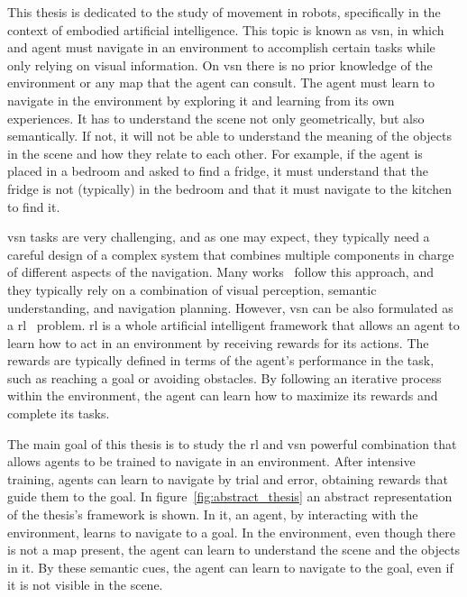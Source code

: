 This thesis is dedicated to the study of movement in robots, specifically in the context of embodied artificial intelligence.
This topic is known as \acrfull{vsn}, in which and agent must navigate in an environment to accomplish certain tasks while only relying on visual information.
On \acrshort{vsn} there is no prior knowledge of the environment or any map that the agent can consult.
The agent must learn to navigate in the environment by exploring it and learning from its own experiences.
It has to understand the scene not only geometrically, but also semantically.
If not, it will not be able to understand the meaning of the objects in the scene and how they relate to each other.
For example, if the agent is placed in a bedroom and asked to find a fridge, it must understand that the fridge is not (typically) in the bedroom and that it must navigate to the kitchen to find it.

\acrshort{vsn} tasks are very challenging, and as one may expect, they typically need a careful design of a complex system that combines multiple components in charge of different aspects of the navigation.
Many works~\cite{newcombe2011, thrun2001, jones2011, sattler2018, Kazerouni2022, campos2021, labbe2022, zhang2018, rosinol2020, jin2023} follow this approach, and they typically rely on a combination of visual perception, semantic understanding, and navigation planning.
However, \acrshort{vsn} can be also formulated as a \acrfull{rl}~\cite{sutton2018} problem.
\acrshort{rl} is a whole artificial intelligent framework that allows an agent to learn how to act in an environment by receiving rewards for its actions.
The rewards are typically defined in terms of the agent's performance in the task, such as reaching a goal or avoiding obstacles.
By following an iterative process within the environment, the agent can learn how to maximize its rewards and complete its tasks.

The main goal of this thesis is to study the \acrshort{rl} and \acrshort{vsn} powerful combination that allows agents to be trained to navigate in an environment.
After intensive training, agents can learn to navigate by trial and error, obtaining rewards that guide them to the goal.
In figure~\ref{fig:abstract_thesis} an abstract representation of the thesis's framework is shown.
In it, an agent, by interacting with the environment, learns to navigate to a goal.
In the environment, even though there is not a map present, the agent can learn to understand the scene and the objects in it.
By these semantic cues, the agent can learn to navigate to the goal, even if it is not visible in the scene.

